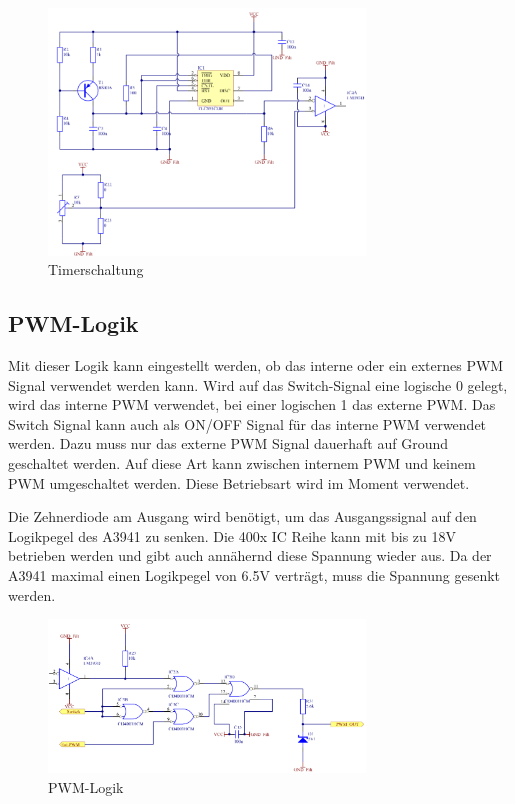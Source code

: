 \begin{figure}[h!]
	\centering
	\includegraphics[width=0.75\textwidth]{src/dc/fig/timer_schematic.png}
	\caption{Timerschaltung}
\end{figure}

\newpage
\subsection{PWM-Logik}
Mit dieser Logik kann eingestellt werden, ob das interne oder ein externes
PWM Signal verwendet werden kann. Wird auf das Switch-Signal eine logische
0 gelegt, wird das interne PWM verwendet, bei einer logischen 1 das externe
PWM. Das Switch Signal kann auch als ON/OFF Signal für das interne PWM
verwendet werden. Dazu muss nur das externe PWM Signal dauerhaft auf Ground
geschaltet werden. Auf diese Art kann zwischen internem PWM und keinem PWM
umgeschaltet werden. Diese Betriebsart wird im Moment verwendet.

Die Zehnerdiode am Ausgang wird benötigt, um das Ausgangssignal auf den
Logikpegel des A3941 zu senken. Die 400x IC Reihe kann mit bis zu 18V
betrieben werden und gibt auch annähernd diese Spannung wieder aus. Da der
A3941 maximal einen Logikpegel von 6.5V verträgt, muss die Spannung
gesenkt werden.

\begin{figure}[h!]
	\centering
	\includegraphics[width=0.75\textwidth]{src/dc/fig/pwm_schematic.png}
	\caption{PWM-Logik}
\end{figure}

